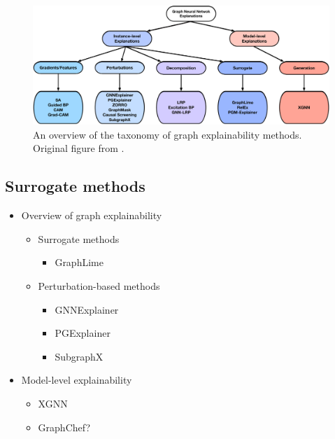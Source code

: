 \begin{figure}
	\includegraphics[width=\linewidth]{images/graph-explainability-taxonomy.pdf}
	\caption{An overview of the taxonomy of graph explainability methods. Original figure from \cite{yuan_explainability_2022}.}
	\label{fig:graph-explainability-taxonomy}
\end{figure}


\subsection{Surrogate methods}

\cite{huang_graphlime_2023}

\begin{itemize}
	\item Overview of graph explainability
		\begin{itemize}
			\item Surrogate methods
				\begin{itemize}
					\item GraphLime
				\end{itemize}
			\item Perturbation-based methods
				\begin{itemize}
					\item GNNExplainer
					\item PGExplainer
					\item SubgraphX
				\end{itemize}
		\end{itemize}
	\item Model-level explainability
		\begin{itemize}
			\item XGNN
			\item GraphChef?
		\end{itemize}
\end{itemize}
